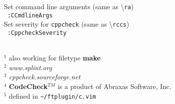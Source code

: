 \documentclass[oneside,11pt,landscape,DIV16]{scrartcl}
\begin{document}
\begin{multicols}{3}
\begin{center}
\begin{flushleft}
%
Set command line arguments (same as \textbackslash\texttt{ra})\\[1.0ex]
\texttt{ :CCmdlineArgs}\\[1.0ex]
%
Set severity for \texttt{cppcheck} (same as \textbackslash\texttt{rccs})\\[1.0ex]
\texttt{ :CppcheckSeverity}\\[1.0ex]
%
\vfill
\begin{minipage}[b]{65mm}%
%
\scriptsize{%
\hrulefill\\
$^1$ also working for filetype \textbf{make}\\
$^2$ \textit{www.splint.org}\\
$^3$ \textit{cppcheck.sourceforge.net}\\
$^4$ \textbf{CodeCheck}$^{TM}$ is a product of Abraxas Software, Inc.\\
$^5$ defined in \verb'~/ftplugin/c.vim'
}%
%
\end{minipage}
%
\end{flushleft}
%
\end{center}
\end{multicols}
\end{document}
